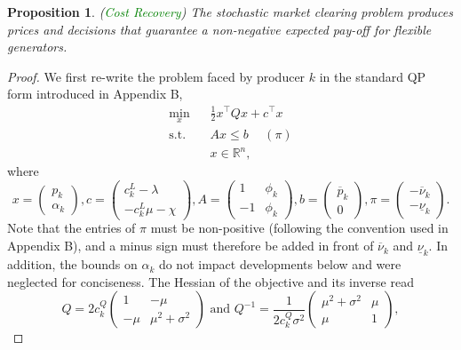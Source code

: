 \documentclass{article}
\newtheorem{proposition}{Proposition}
\begin{document}
\begin{proposition}
(\textcolor{green}{Cost Recovery}) The stochastic market clearing problem produces prices and decisions that guarantee a non-negative expected pay-off for flexible generators.
\end{proposition}
\begin{proof}
We first re-write the problem faced by producer $k$ in the standard QP form introduced in Appendix B,
\begin{align*}
\underset{x}{\min} \hspace{10pt} & \frac{1}{2}x^\top Q x + c^\top x\\
\mbox{s.t. } & Ax \le b \hspace{15pt} (\pi)\\
&x \in \mathbb{R}^n,
\end{align*}
where
\begin{equation*}
x = \begin{pmatrix} p_k \\ \alpha_k \end{pmatrix}, c = \begin{pmatrix} c_k^L - \lambda \\ -c_k^L \mu - \chi \end{pmatrix}, A = \begin{pmatrix} 1 & \phi_k \\ -1 & \phi_k \end{pmatrix}, b = \begin{pmatrix} \overline{p}_k\\0\end{pmatrix}, \pi = \begin{pmatrix} -\overline{\nu}_k \\ -\underline{\nu}_k \end{pmatrix}.
\end{equation*}
Note that the entries of $\pi$ must be non-positive (following the convention used in Appendix B), and a minus sign must therefore be added in front of $\overline{\nu}_k$ and $\underline{\nu}_k$. In addition, the bounds on $\alpha_k$ do not impact developments below and were neglected for conciseness. The Hessian of the objective and its inverse read
\begin{equation*}
Q = 2 c_k^Q  \begin{pmatrix} 1 & -\mu \\ -\mu & \mu^2 + \sigma^2 \end{pmatrix} \mbox{ and } Q^{-1} = \frac{1}{2 c_k^Q \sigma^2} \begin{pmatrix} \mu^2 + \sigma^2 & \mu \\ \mu & 1 \end{pmatrix},

\end{equation*}
\end{proof}
\end{document}
